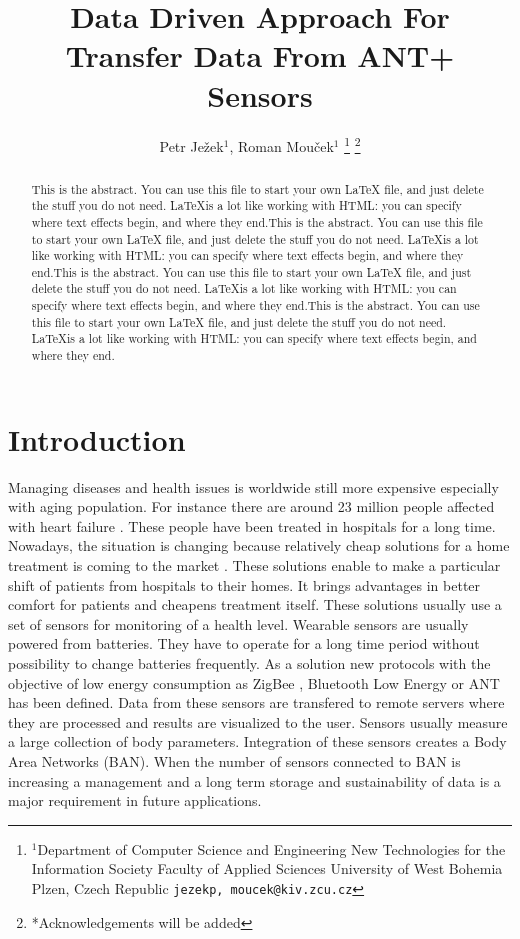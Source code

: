 \documentclass[conference]{IEEEconf}
\begin{document}
  \title{Data Driven Approach For Transfer Data  From ANT+ Sensors}

  \author{{Petr Je\v{z}ek$^{1}$, Roman Mou\v{c}ek$^{1}$}
\thanks{$^{1}$Department of Computer Science and Engineering
New Technologies for the Information Society
Faculty of Applied Sciences
University of West Bohemia
Plzen, Czech Republic
        {\tt\small {jezekp, moucek}@kiv.zcu.cz}}%
\thanks{*Acknowledgements will be added}%
}
\maketitle


\begin{abstract}
This is the abstract. You can use this file to start your own LaTeX file,
and just delete the stuff you do not need. \LaTeX  is a lot like working
with HTML: you can specify where text effects begin, and where they end.This is the abstract. You can use this file to start your own LaTeX file,
and just delete the stuff you do not need. \LaTeX  is a lot like working
with HTML: you can specify where text effects begin, and where they end.This is the abstract. You can use this file to start your own LaTeX file,
and just delete the stuff you do not need. \LaTeX  is a lot like working
with HTML: you can specify where text effects begin, and where they end.This is the abstract. You can use this file to start your own LaTeX file,
and just delete the stuff you do not need. \LaTeX  is a lot like working
with HTML: you can specify where text effects begin, and where they end.
\end{abstract}

\section{Introduction}\label{sec:intro}
Managing diseases and health issues is worldwide still more expensive especially with aging population. For instance there are around 23 million people affected with heart failure \cite{bui2011epidemiology}. These people have been treated in hospitals for a long time. Nowadays, the situation is changing because relatively cheap solutions for a home treatment is coming to the market \cite{4761985, 5333913}. These solutions enable to make a particular shift of patients from hospitals to their homes. It brings advantages in better comfort for patients and cheapens treatment itself. These solutions usually use a set of sensors for monitoring of a health level. Wearable sensors are usually powered from batteries. They have to operate for a long time period without possibility to change batteries frequently. As a solution new protocols with the objective of low energy consumption as ZigBee \cite{Farahani:2008:ZWN:1457417}, Bluetooth Low Energy \cite{heydon2012bluetooth} or ANT \cite{zaloker2014ant} has been defined.  Data from these sensors are transfered to remote servers where they are processed and results are visualized to the user. Sensors usually measure a large collection of body parameters. Integration of these sensors creates a Body Area Networks (BAN). When the number of sensors connected to BAN is increasing a management and a long term storage and sustainability of data is a major requirement in future applications.
\end{document}
